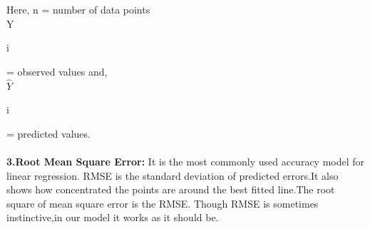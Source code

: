 \documentclass[conference]{IEEEtran}[10]
\begin{document}
Here, n = number of data points\\
      Y\begin{footnotesize}
      i
      \end{footnotesize} = observed values and,\\
      $\widehat{Y}$\begin{footnotesize}
      i
      \end{footnotesize} = predicted values.\\
\\      
\textbf{3.Root Mean Square Error:}
It is the most commonly used accuracy model for linear regression. RMSE is the standard deviation of predicted errors.It also shows how concentrated the points are around the best fitted line.The root square of mean square error is the RMSE. Though RMSE is sometimes instinctive,in our model it works as it should be. 
\\


\end{document}
